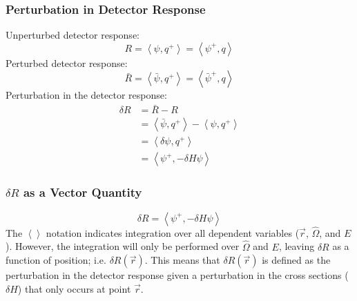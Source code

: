\documentclass[t]{beamer}
\begin{document}
\begin{frame}
  \frametitle{Perturbation in Detector Response}
  Unperturbed detector response:
  \begin{equation}
    R = \left<\psi,q^+\right> = \left<\psi^+,q\right>
  \end{equation}
  Perturbed detector response:
  \begin{equation}
    \bar{R} = \left<\bar{\psi},q^+\right> = \left<\bar{\psi}^+,q\right>
  \end{equation}
  Perturbation in the detector response:
  \begin{equation}\begin{split}
    \delta R & = \bar{R} - R \\
             & = \left<\bar{\psi},q^+\right> - \left<\psi,q^+\right> \\
             & = \left<\delta\psi,q^+\right> \\
             & = \left<\psi^+,-\delta H\psi\right>
  \end{split}\end{equation}
\end{frame}

\begin{frame}
  \frametitle{$\delta R$ as a Vector Quantity}
  \begin{equation*}
    \delta R = \left<\psi^+,-\delta H\psi\right>
  \end{equation*}
  The $\left<\right>$ notation indicates integration over all dependent
  variables ($\vec{r}$, $\hat{\Omega}$, and $E$). However, the integration will
  only be performed over $\hat{\Omega}$ and $E$, leaving $\delta R$ as a
  function of position; i.e. $\delta R\left(\vec{r}\right)$.
  \newline\newline
  This means that $\delta R\left(\vec{r}\right)$ is defined as the perturbation
  in the detector response given a perturbation in the cross sections
  ($\delta H$) that only occurs at point $\vec{r}$.
\end{frame}
\end{document}

